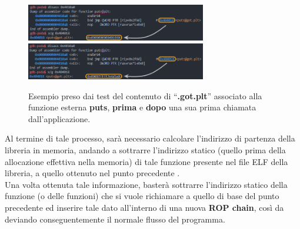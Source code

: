 \begin{figure}
    \centering
    \includegraphics[width=0.70\textwidth]{images/puts-precall.png}
    \\
    \includegraphics[width=0.70\textwidth]{images/puts-aftercall.png}
    \caption{\label{fig:plt}Esempio preso dai test del contenuto di ``\textbf{.got.plt}'' associato alla funzione esterna \textbf{puts}, \textbf{prima} e \textbf{dopo} una sua prima chiamata dall'applicazione.}
\end{figure}

Al termine di tale processo, sarà necessario calcolare l'indirizzo di partenza della libreria in memoria, andando a sottrarre l'indirizzo statico (quello prima della allocazione effettiva nella memoria) di tale funzione presente nel file ELF della libreria, a quello ottenuto nel punto precedente \cite*{Return2plt}.\\
Una volta ottenuta tale informazione, basterà sottrarre l'indirizzo statico della funzione (o delle funzioni) che si vuole richiamare a quello di base del punto precedente ed inserire tale dato all'interno di una nuova \textbf{ROP chain}, così da deviando conseguentemente il normale flusso del programma.

